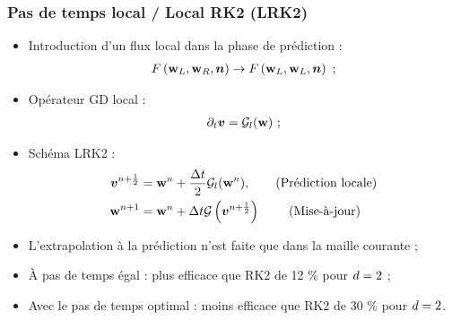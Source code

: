 \begin{frame}
\frametitle{Pas de temps local / Local RK2 (LRK2)}
\vfill
\begin{itemize}
\item Introduction d'un flux local dans la phase de prédiction :
\begin{align*}
	F\left(\bm{\mathrm{w}}_L,\bm{\mathrm{w}}_R,\bm{n}\right) \rightarrow F\left(\bm{\mathrm{w}}_L,\bm{\mathrm{w}}_L,\bm{n}\right) \ ;
\end{align*}
\item Opérateur GD local :
\begin{align*}
	\partial_{t} \bm{v} = \mathcal{G}_l(\bm{\mathrm{w}}) \ ;
\end{align*}
\item Schéma LRK2 :
\begin{align*}
	\bm{v}^{n+\frac{1}{2}} &= \bm{\mathrm{w}}^n
		+ \frac{\Delta t}{2} \mathcal{G}_l(\bm{\mathrm{w}}^n) ,
	\tag{Prédiction locale} \\
	\bm{\mathrm{w}}^{n+1} &= \bm{\mathrm{w}}^n
		+ \Delta t \mathcal{G}\left(\bm{v}^{n+\frac{1}{2}}\right) \;
	\tag{Mise-à-jour}
\end{align*}
\item L'extrapolation à la prédiction n'est faite que dans la maille courante ;
\item À pas de temps égal : plus efficace que RK2 de 12 \% pour $d = 2$ ;
\item Avec le pas de temps optimal : moins efficace que RK2 de 30 \% pour $d = 2$.
\end{itemize}
\vfill
\end{frame}

